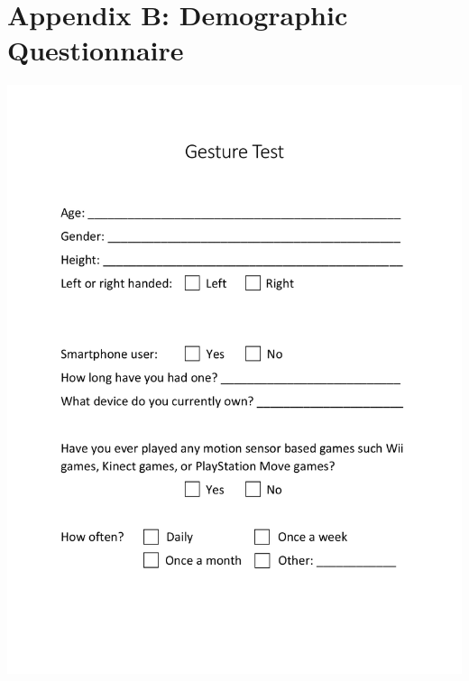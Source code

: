 \section{Appendix B: Demographic Questionnaire}
\begin{adjustbox}{width=1\textwidth}
	\includegraphics{images/demographics.pdf}
\end{adjustbox}


